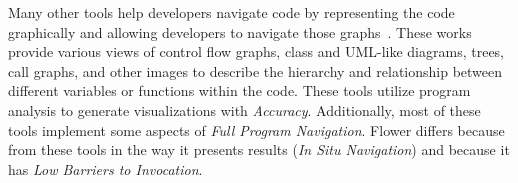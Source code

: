 \documentclass[conference]{IEEEtran}
\begin{document}
Many other tools help developers navigate code by representing the code graphically and allowing developers to navigate those graphs~\cite{CodeBubbles,CodeCanvas,CodeSurfer,Dora,Reacher,Relo,Whyline}. 
These works provide various views of control flow graphs, class and UML-like diagrams, trees, call graphs, and other images to describe the hierarchy and relationship between different variables or functions within the code. 
These tools utilize program analysis to generate visualizations with \textit{Accuracy}.
Additionally, most of these tools implement some aspects of \textit{Full Program Navigation}.
Flower differs because from these tools in the way it presents results (\textit{In Situ Navigation}) and because it has \textit{Low Barriers to Invocation}.

%
\end{document}
